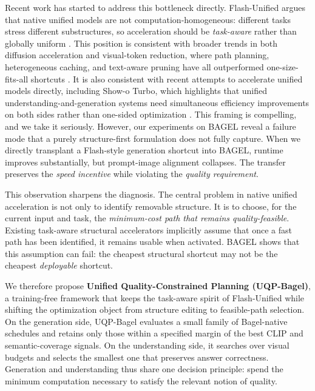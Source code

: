 \documentclass{article}
\begin{document}
Recent work has started to address this bottleneck directly. Flash-Unified argues that native unified models are not computation-homogeneous: different tasks stress different substructures, so acceleration should be \emph{task-aware} rather than globally uniform \citep{flash}. This position is consistent with broader trends in both diffusion acceleration and visual-token reduction, where path planning, heterogeneous caching, and text-aware pruning have all outperformed one-size-fits-all shortcuts \citep{dpcache,hetcache,fastv,sparsevlm,swiftvlm}. It is also consistent with recent attempts to accelerate unified models directly, including Show-o Turbo, which highlights that unified understanding-and-generation systems need simultaneous efficiency improvements on both sides rather than one-sided optimization \citep{showoturbo}. This framing is compelling, and we take it seriously. However, our experiments on BAGEL reveal a failure mode that a purely structure-first formulation does not fully capture. When we directly transplant a Flash-style generation shortcut into BAGEL, runtime improves substantially, but prompt-image alignment collapses. The transfer preserves the \emph{speed incentive} while violating the \emph{quality requirement}.

This observation sharpens the diagnosis. The central problem in native unified acceleration is not only to identify removable structure. It is to choose, for the current input and task, the \emph{minimum-cost path that remains quality-feasible}. Existing task-aware structural accelerators implicitly assume that once a fast path has been identified, it remains usable when activated. BAGEL shows that this assumption can fail: the cheapest structural shortcut may not be the cheapest \emph{deployable} shortcut.

We therefore propose \textbf{Unified Quality-Constrained Planning (UQP-Bagel)}, a training-free framework that keeps the task-aware spirit of Flash-Unified while shifting the optimization object from structure editing to feasible-path selection. On the generation side, UQP-Bagel evaluates a small family of Bagel-native schedules and retains only those within a specified margin of the best CLIP and semantic-coverage signals. On the understanding side, it searches over visual budgets and selects the smallest one that preserves answer correctness. Generation and understanding thus share one decision principle: spend the minimum computation necessary to satisfy the relevant notion of quality.
\end{document}
